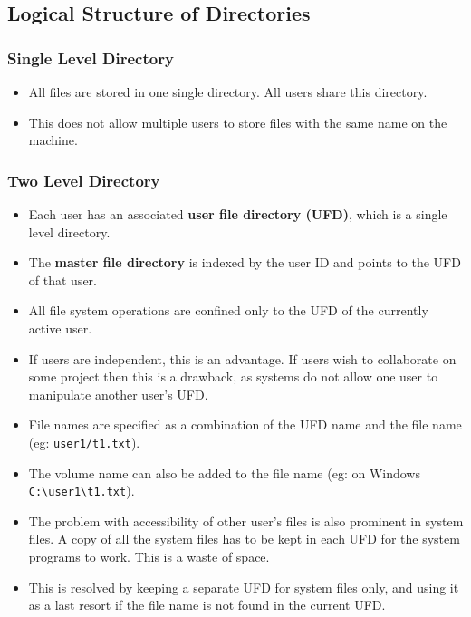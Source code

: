 \documentclass{article}
\theoremstyle{plain}
\theoremstyle{definition}
\begin{document}
\subsection{Logical Structure of Directories}
\subsubsection{Single Level Directory}
\begin{itemize}
    \item All files are stored in one single directory. All users share this directory. 
    
    \item This does not allow multiple users to store files with the same name on the machine. 
\end{itemize}

\subsubsection{Two Level Directory}
\begin{itemize}
    \item Each user has an associated \textbf{user file directory (UFD)}, which is a single level directory.
    
    \item The \textbf{master file directory} is indexed by the user ID and points to the UFD of that user. 
    
    \item All file system operations are confined only to the UFD of the currently active user. 
    
    \item If users are independent, this is an advantage. If users wish to collaborate on some project then this is a drawback, as systems do not allow one user to manipulate another user's UFD. 
    
    \item File names are specified as a combination of the UFD name and the file name (eg: \texttt{user1/t1.txt}). 
    
    \item The volume name can also be added to the file name (eg: on Windows \texttt{C:\textbackslash user1\textbackslash t1.txt}). 
    
    \item The problem with accessibility of other user's files is also prominent in system files. A copy of all the system files has to be kept in each UFD for the system programs to work. This is a waste of space.
    
    \item This is resolved by keeping a separate UFD for system files only, and using it as a last resort if the file name is not found in the current UFD. 
\end{itemize}
\end{document}
